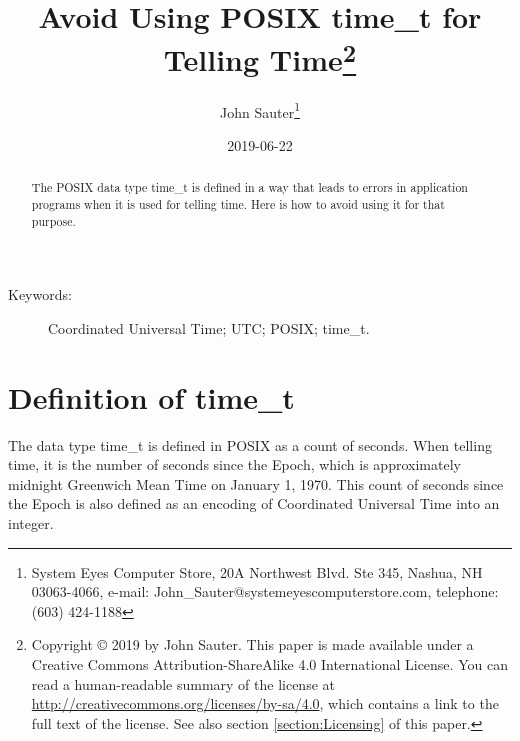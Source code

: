 \documentclass[letterpaper,twoside]{article}
\begin{document}
\title{Avoid Using POSIX {\ttfamily time\_t} for Telling
  Time\footnote{Copyright
    {\copyright} 2019 by John Sauter.
    This paper is made available under a
    Creative Commons Attribution-ShareAlike 4.0 International License.
    You can read a human-readable summary of the license at
    \url{http://creativecommons.org/licenses/by-sa/4.0}, which contains
    a link to the full text of the license.
    See also section \ref{section:Licensing} of this paper.}
}
\author{John Sauter\footnote{
    System Eyes Computer Store,
    20A Northwest Blvd.  Ste 345,
    Nashua, NH  03063-4066,
    e-mail: John\_Sauter@systemeyescomputerstore.com,
    telephone: (603) 424-1188}}
\date{2019-06-22}
\maketitle
\begin{abstract}
  The POSIX data type {\ttfamily time\_t} is defined in a way that leads
  to errors in application programs when it is used for telling time.
  Here is how to avoid using it for that purpose.
\end{abstract}
\begin{description}
\item[Keywords:]Coordinated Universal Time; UTC; POSIX; time\_t.
\end{description}
  
\newpage

\section{Definition of {\ttfamily time\_t}}
The data type {\ttfamily time\_t} is defined in POSIX\citep{7582338}
as a count of seconds.
When telling time, it is the number of seconds
since the Epoch, which is approximately midnight Greenwich Mean Time on
January 1, 1970.  This count of seconds since the Epoch is also
defined as an encoding of Coordinated Universal Time into an integer.
\end{document}
